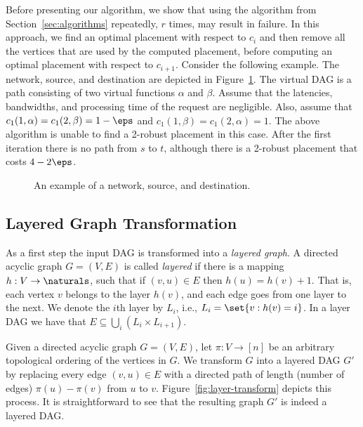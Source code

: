 Before presenting our algorithm, we show that using the algorithm from
Section~\ref{sec:algorithms} repeatedly, $r$ times, may result in
failure.  In this approach, we find an optimal placement with respect
to $c_i$ and then remove all the vertices that are used by the
computed placement, before computing an optimal placement with respect
to $c_{i+1}$.
%
Consider the following example.  The network, source, and destination
are depicted in Figure~\ref{fig:greedy-bad}.  The virtual DAG is a
path consisting of two virtual functions $\alpha$ and $\beta$.  Assume
that the latencies, bandwidths, and processing time of the request are
negligible.  Also, assume that $c_1(1, \alpha) = c_1(2,\beta) =
1-\eps$ and $c_1(1, \beta) = c_1(2, \alpha) = 1$.
%
The above algorithm is unable to find a 2-robust placement in this
case.  After the first iteration there is no path from $s$ to $t$,
although there is a 2-robust placement that costs $4 - 2 \eps$.

\begin{figure}[t]
\begin{center}
\end{center}
\caption[\scp{} - Greedy algorithm, worst case]{An example of a network, source, and destination.}
\label{fig:greedy-bad}
\end{figure}


\subsection{Layered Graph Transformation}

As a first step the input DAG is transformed into a \emph{layered
  graph}.
%
A directed acyclic graph $G = (V,E)$ is called \emph{layered} if there
is a mapping $h:V \to \naturals$, such that if $(v,u) \in E$ then
$h(u) = h(v) + 1$.  That is, each vertex $v$ belongs to the layer
$h(v)$, and each edge goes from one layer to the next.
%
We denote the $i$th layer by $L_i$, i.e., $L_i = \set{v : h(v) = i}$.
In a layer DAG we have that $E \subseteq \bigcup_i (L_i \times
L_{i+1})$.

Given a directed acyclic graph $G = (V,E)$, let $\pi:V \to [n]$ be an
arbitrary topological ordering of the vertices in $G$.  We transform
$G$ into a layered DAG $G'$ by replacing every edge $(v,u) \in E$ with
a directed path of length (number of edges) $\pi(u) - \pi(v)$ from $u$
to $v$.
%
Figure~\ref{fig:layer-transform} depicts this process.  It is
straightforward to see that the resulting graph $G'$ is indeed a
layered DAG.

